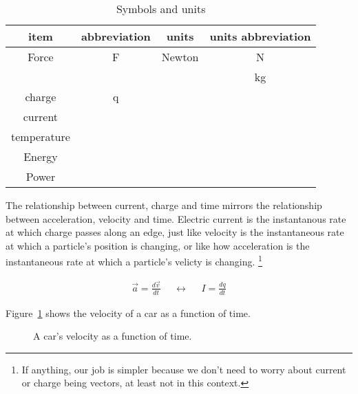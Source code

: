 \par
\begin{table}[H]
\begin{center}
\begin{tabular}{|c|c|c|c|} \hline
item	&	abbreviation & units & units abbreviation \\ \hline
Force	&	F	& Newton	& N\\ \hline
	&		&	&	kg	\\ \hline
charge	& q	&&	\\ \hline
current		&&&	\\ \hline
temperature		&&&	\\ \hline
Energy	&&&	\\ \hline
Power	&&&	\\ \hline
\end{tabular}
\caption{Symbols and units}
\label{F:2SU}
\end{center}
\end{table}

\noindent
The relationship between current, charge and time mirrors the relationship between acceleration, velocity and time. Electric current is the instantanous rate at which charge passes along an edge, just like velocity is the instantaneous rate at which a particle's position is changing, or like how acceleration is the instantaneous rate at which a particle's velicty is changing. \footnote{If anything, our job is simpler because we don't need to worry about current or charge being vectors, at least not in this context.} 

\par
\begin{align}
\vec{a} = \frac{d\vec{v}}{dt}&&\leftrightarrow&&I = \frac{dq}{dt}
\end{align}
\par
Figure~\ref{F:2CAR} shows the velocity of a car as a function of time.
\par
\begin{figure}[H]
\begin{center}
\caption{A car's velocity as a function of time.}
\label{F:2CAR}
\end{center}
\end{figure}

